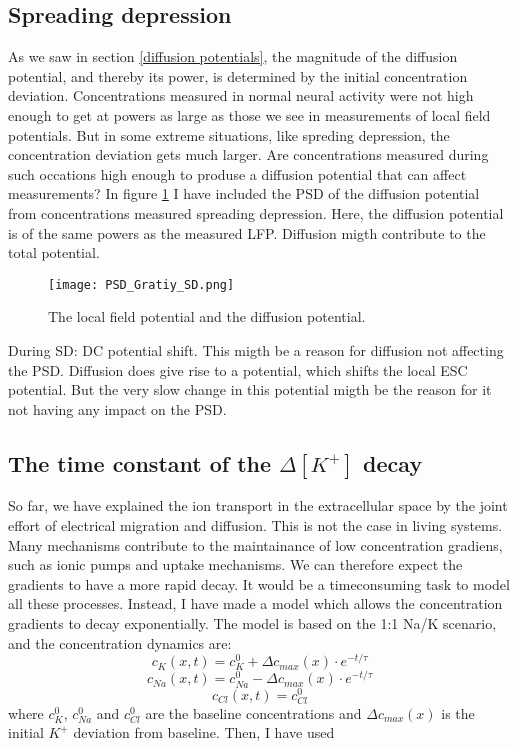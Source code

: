 \documentclass{article}
\begin{document}
\subsection{Spreading depression}

As we saw in section \ref{diffusion potentials}, the magnitude of the diffusion potential, and thereby its power, is determined by the initial concentration deviation. Concentrations measured in normal neural activity were not high enough to get at powers as large as those we see in measurements of local field potentials. But in some extreme situations, like spreding depression, the concentration deviation gets much larger. Are concentrations measured during such occations high enough to produse a diffusion potential that can affect measurements? In figure \ref{fig:PSD_Gratiy_SD} I have included the PSD of the diffusion potential from concentrations measured spreading depression. Here, the diffusion potential is of the same powers as the measured  LFP. Diffusion migth contribute to the total potential. 

\begin{figure}
  \texttt{[image: PSD\_Gratiy\_SD.png]}
  \caption{The local field potential and the diffusion potential. }
  \label{fig:PSD_Gratiy_SD}
\end{figure}

During SD: DC potential shift. This migth be a reason for diffusion not affecting the PSD. Diffusion does give rise to a potential, which shifts the local ESC potential. But the very slow change in this potential migth be the reason for it not having any impact on the PSD.

\subsection{The time constant of the  $\Delta [K^+]$ decay}\label{exponential decay}
So far, we have explained the ion transport in the extracellular space by the joint effort of electrical migration and diffusion. This is not the case in living systems. Many mechanisms contribute to the maintainance of low concentration gradiens, such as ionic pumps and uptake mechanisms. We can therefore expect the gradients to have a more rapid decay. It would be a timeconsuming task to model all these processes. Instead, I have made a model which allows the concentration gradients to decay exponentially. The model is based on the 1:1 Na/K scenario, and the concentration dynamics are:
$$
c_{K}(x,t) = c_{K}^0 +\Delta c_{max}(x) \cdot e^{-t/\tau}
$$
$$
c_{Na}(x,t) = c_{Na}^0 -\Delta c_{max}(x) \cdot e^{-t/\tau}
$$
$$
c_{Cl}(x,t) = c_{Cl}^0
$$
where $c_{K}^0$, $c_{Na}^0$ and $c_{Cl}^0$ are the baseline concentrations and $\Delta c_{max} (x)$ is the initial $K^+$ deviation from baseline.  Then, I have used 
\end{document}
